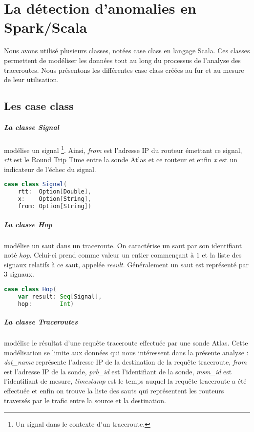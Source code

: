 \chapter{La détection d'anomalies en Spark/Scala} \label{application:spark}

Nous avons utilisé plusieurs classes, notées case class en langage Scala. Ces classes permettent de modéliser les données tout au long du processus de l'analyse des traceroutes. 
Nous présentons les différentes case class créées au fur et au mesure de leur utilisation.


\section{Les case class }

\paragraph{La classe Signal} modélise un signal \footnote{Un signal dans le contexte d'un traceroute.}. Ainsi, \textit{from} est l'adresse IP du routeur émettant ce signal, \textit{rtt} est le Round Trip Time entre la sonde Atlas et ce routeur et enfin \textit{x} est un indicateur de l'échec du signal.
\begin{lstlisting}[language=scala, caption={La classe Signal en Scala }]
case class Signal(
	rtt:  Option[Double],
	x:    Option[String],
	from: Option[String])

\end{lstlisting}

\paragraph{La classe Hop} modélise un saut dans un traceroute. On caractérise un saut par son identifiant noté \textit{hop}. Celui-ci   prend comme valeur un entier commençant à $1$ et la liste des signaux relatifs à ce saut, appelée  \textit{result}. Généralement un saut est représenté par $3$ signaux.
\begin{lstlisting}[language=scala, caption={La classe Hop en Scala }]
case class Hop(
	var result: Seq[Signal],
	hop:        Int)
\end{lstlisting}
\paragraph{La classe Traceroutes} modélise le résultat d'une requête traceroute effectuée par une sonde Atlas. Cette modélisation se limite aux données qui nous intéressent dans la présente analyse : 
\textit{dst\_name} représente l'adresse IP de la destination de la requête traceroute, \textit{from} est l'adresse IP de la sonde, \textit{prb\_id} est l'identifiant de la sonde, \textit{msm\_id} est l'identifiant de mesure, \textit{timestamp} est le temps auquel la requête traceroute a été effectuée et enfin on trouve la liste des sauts qui représentent les routeurs traversés par le trafic entre la source et la destination. 

